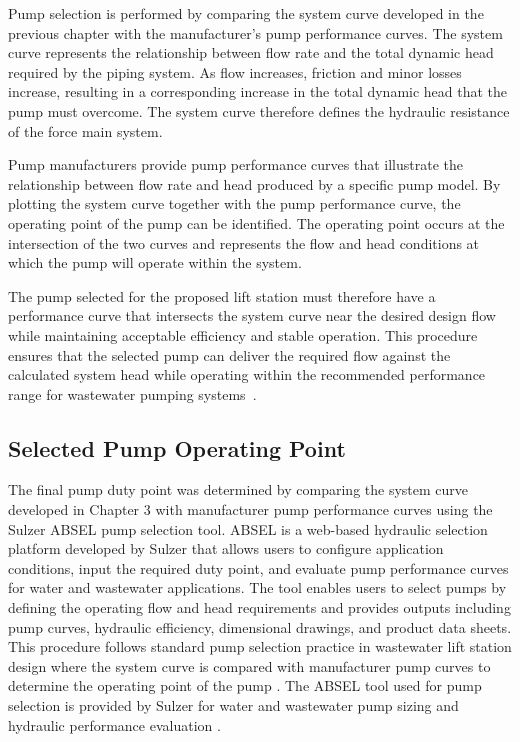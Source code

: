 Pump selection is performed by comparing the system curve developed in the previous chapter with the manufacturer's pump performance curves. The system curve represents the relationship between flow rate and the total dynamic head required by the piping system. As flow increases, friction and minor losses increase, resulting in a corresponding increase in the total dynamic head that the pump must overcome. The system curve therefore defines the hydraulic resistance of the force main system.

Pump manufacturers provide pump performance curves that illustrate the relationship between flow rate and head produced by a specific pump model. By plotting the system curve together with the pump performance curve, the operating point of the pump can be identified. The operating point occurs at the intersection of the two curves and represents the flow and head conditions at which the pump will operate within the system.~\cite{Jensen_PumpStationDesignGuidelines_2012}

The pump selected for the proposed lift station must therefore have a performance curve that intersects the system curve near the desired design flow while maintaining acceptable efficiency and stable operation. This procedure ensures that the selected pump can deliver the required flow against the calculated system head while operating within the recommended performance range for wastewater pumping systems~\cite{ProjectD_Colebrooke_2020}.



\subsection{Selected Pump Operating Point}

The final pump duty point was determined by comparing the system curve developed in Chapter 3 with manufacturer pump performance curves using the Sulzer ABSEL pump selection tool. ABSEL is a web-based hydraulic selection platform developed by Sulzer that allows users to configure application conditions, input the required duty point, and evaluate pump performance curves for water and wastewater applications. The tool enables users to select pumps by defining the operating flow and head requirements and provides outputs including pump curves, hydraulic efficiency, dimensional drawings, and product data sheets. This procedure follows standard pump selection practice in wastewater lift station design where the system curve is compared with manufacturer pump curves to determine the operating point of the pump \cite{Jensen_PumpStationDesignGuidelines_2012,EPA_LiftStation_DesignManual_2004}. The ABSEL tool used for pump selection is provided by Sulzer for water and wastewater pump sizing and hydraulic performance evaluation \cite{Sulzer_ABSEL}.

